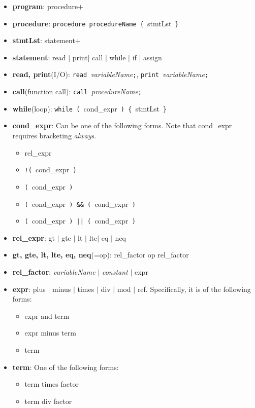 \documentclass[12pt]{article}
\theoremstyle{definition}
\begin{document}
\begin{itemize}
	\item \textbf{program}: procedure$+$
	\item \textbf{procedure}: \texttt{procedure procedureName \{ }stmtLst\texttt{ \}}
	\item \textbf{stmtLst}: statement$+$
	\item \textbf{statement}: read $|$ print$|$ call $|$ while $|$ if $|$ assign
	\item \textbf{read, print}(I/O): \texttt{read }\textit{variableName}\texttt{;}, \texttt{print }\textit{variableName}\texttt{;}
	\item \textbf{call}(function call): \texttt{call }\textit{procedureName}\texttt{;}
	\item \textbf{while}(loop): \texttt{while ( }cond\_expr\texttt{ ) \{ }stmtLst\texttt{ \}} 
	\item \textbf{cond\_expr}: Can be one of the following forms. Note that cond\_expr requires bracketing \textit{always}.
	\begin{itemize}
		\item rel\_expr
		\item \texttt{!( }cond\_expr\texttt{ )}
		\item \texttt{( }cond\_expr\texttt{ )}
		\item \texttt{( }cond\_expr\texttt{ ) \&\& ( }cond\_expr\texttt{ )}
		\item \texttt{( }cond\_expr\texttt{ ) || ( }cond\_expr\texttt{ )}
	\end{itemize}
	\item \textbf{rel\_expr}: gt $|$ gte $|$ lt $|$ lte$|$ eq $|$ neq
	\item \textbf{gt, gte, lt, lte, eq, neq}(=op): rel\_factor op rel\_factor
	\item \textbf{rel\_factor}: \textit{variableName} $|$ \textit{constant} $|$ expr
	\item \textbf{expr}: plus $|$ minus $|$ times $|$ div $|$ mod $|$ ref. Specifically, it is of the following forms:
	\begin{itemize}
		\item expr and term
		\item expr minus term
		\item term
	\end{itemize}
	\item \textbf{term}: One of the following forms:
	\begin{itemize}
		\item term times factor
		\item term div factor

\end{itemize}
\end{itemize}
\end{document}

